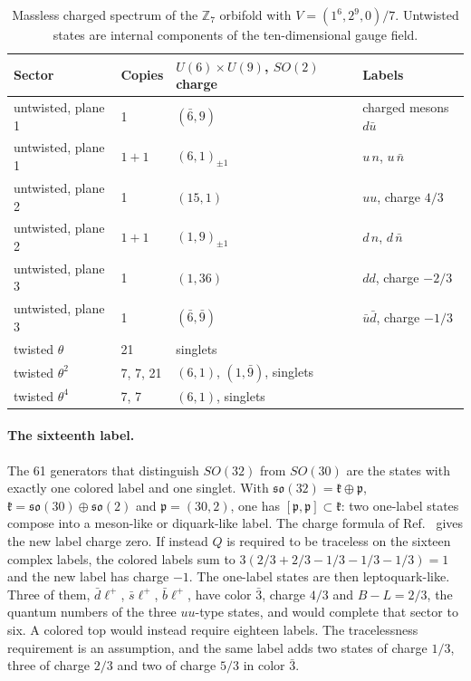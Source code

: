 \begin{table}[ht]
\centering
\caption{Massless charged spectrum of the $\mathbb Z_7$ orbifold with
$V=(1^6,2^9,0)/7$. Untwisted states are internal components of the
ten-dimensional gauge field.}
\label{tab:z7}
\begin{tabular}{@{}llll@{}}
\toprule
Sector & Copies & $U(6)\times U(9)$, $SO(2)$ charge & Labels \\
\midrule
untwisted, plane 1 & 1 & $(\bar6,9)$ & charged mesons $d\bar u$ \\
untwisted, plane 1 & $1+1$ & $(6,1)_{\pm1}$ & $u\,n$, $u\,\bar n$ \\
untwisted, plane 2 & 1 & $(15,1)$ & $uu$, charge $4/3$ \\
untwisted, plane 2 & $1+1$ & $(1,9)_{\pm1}$ & $d\,n$, $d\,\bar n$ \\
untwisted, plane 3 & 1 & $(1,36)$ & $dd$, charge $-2/3$ \\
untwisted, plane 3 & 1 & $(\bar6,\bar9)$ & $\bar u\bar d$, charge $-1/3$ \\
twisted $\theta$ & 21 & singlets & \\
twisted $\theta^2$ & 7, 7, 21 & $(6,1)$, $(1,\bar9)$, singlets & \\
twisted $\theta^4$ & 7, 7 & $(6,1)$, singlets & \\
\bottomrule
\end{tabular}
\end{table}

\paragraph{The sixteenth label.}
The 61 generators that distinguish $SO(32)$ from $SO(30)$ are the
states with exactly one colored label and one singlet. With
$\mathfrak{so}(32)=\mathfrak k\oplus\mathfrak p$,
$\mathfrak k=\mathfrak{so}(30)\oplus\mathfrak{so}(2)$ and
$\mathfrak p=(30,2)$, one has
$[\mathfrak p,\mathfrak p]\subset\mathfrak k$: two one-label states
compose into a meson-like or diquark-like label. The charge formula of
Ref.~\cite{Rivero2024} gives the new label charge zero. If instead $Q$
is required to be traceless on the sixteen complex labels, the colored
labels sum to $3(2/3+2/3-1/3-1/3-1/3)=1$ and the new label has charge
$-1$. The one-label states are then leptoquark-like. Three of them,
$\bar d\ell^+$, $\bar s\ell^+$, $\bar b\ell^+$, have color $\bar3$,
charge $4/3$ and $B-L=2/3$, the quantum numbers of the three $uu$-type
states, and would complete that sector to six. A colored top would
instead require eighteen labels. The tracelessness requirement is an
assumption, and the same label adds two states of charge $1/3$, three
of charge $2/3$ and two of charge $5/3$ in color $\bar3$.

